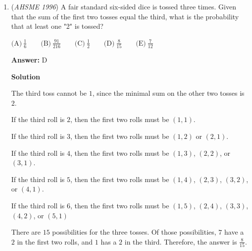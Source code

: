 \begin{enumerate}
 The ratio of areas is  $\frac{\frac{xy}{4n}}{\frac{xy}{4m}} = \frac{m}{n}$, which is answer $\boxed{B}$.

 



\textbf{Solution 2}

Alternately, the algebra can be made simpler if you arbitrarily assume that $(x,y) = (m,n)$, and thus that each side of the rectangle is cut into unit segments.  In that case, the ratio of the areas of the two triangles $A$ and $B$ that have the same base length is just the ratio of the heights.  Triangle $A$ would have height $\frac{m}{2}$, while triangle $B$, while triangle $B$ would have height $\frac{n}{2}$, giving a ratio of $\frac{m}{n}$, which is answer $\boxed{B}$.

 This solution makes the extra assumption that the rectangle has dimensions $m$ by $n$, instead of arbitrary $x$ by $y$ dimensions, and is not a formal "proof"; but since the answer is invariant, extra assumptions will not change the solution.

 


	\item (\textit{AHSME 1996}) A fair standard six-sided dice is tossed three times. Given that the sum of the first two tosses equal the third, what is the probability that at least one "2" is tossed?


 $\text{(A)}\ \frac{1}{6}\qquad\text{(B)}\ \frac{91}{216}\qquad\text{(C)}\ \frac{1}{2}\qquad\text{(D)}\ \frac{8}{15}\qquad\text{(E)}\ \frac{7}{12}$

 \textbf{Answer: }D



\textbf{Solution}

The third toss cannot be $1$, since the minimal sum on the other two tosses is $2$.

 If the third roll is $2$, then the first two rolls must be $(1,1)$.

 If the third roll is $3$, then the first two rolls must be $(1,2)$ or $(2,1)$.

 If the third roll is $4$, then the first two rolls must be $(1,3)$, $(2,2)$, or $(3,1)$.

 If the third roll is $5$, then the first two rolls must be $(1,4)$, $(2,3)$, $(3,2)$, or $(4,1)$.

 If the third roll is $6$, then the first two rolls must be $(1,5)$, $(2,4)$, $(3,3)$, $(4,2)$, or $(5,1)$

 There are $15$ possibilities for the three tosses.  Of those possibilities, $7$ have a $2$ in the first two rolls, and $1$ has a $2$ in the third.  Therefore, the answer is $\boxed{\frac{8}{15}}$.


\end{enumerate}
